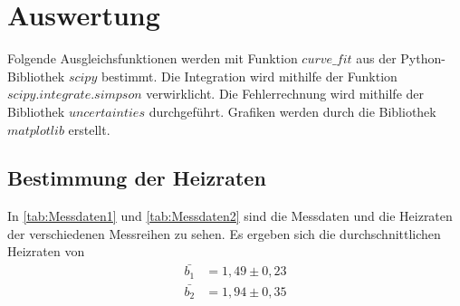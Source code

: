 \section{Auswertung}
\label{sec:auswertung}


Folgende Ausgleichsfunktionen werden mit Funktion $curve\_fit$ aus der Python\cite{py}-Bibliothek $scipy$\cite{2020SciPy-NMeth} bestimmt.
Die Integration wird mithilfe der Funktion $scipy.integrate.simpson$ \cite{2020SciPy-NMeth}verwirklicht.
Die Fehlerrechnung wird mithilfe der Bibliothek $uncertainties$ \cite{unp} durchgeführt.
Grafiken werden durch die Bibliothek $matplotlib$\cite{Hunter:2007} erstellt. 

\subsection{Bestimmung der Heizraten}

In \autoref{tab:Messdaten1} und \autoref{tab:Messdaten2} sind die Messdaten und die Heizraten der verschiedenen Messreihen zu sehen.
Es ergeben sich die durchschnittlichen Heizraten von 
\begin{align}
    \bar{b_1} &=   1,49 \pm  0,23 \label{eq:TheoH1} \\
    \bar{b_2} &=   1,94 \pm  0,35 \label{eq:TheoH2} 
\end{align}

